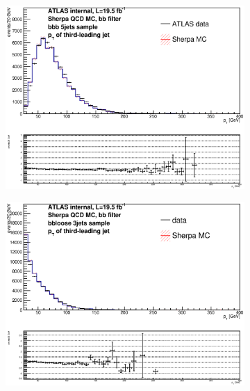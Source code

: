 \begin{figure}[phtb!]
\begin{center}
  \begin{subfigure}[$bbb$ 5+ jet category]{0.3\textwidth}\includegraphics[width=\textwidth]{MonteCarlo/figures/pt2_bbb_5jets.eps}\end{subfigure}
  \begin{subfigure}[$bbloose$ 3 jet category]{0.3\textwidth}\includegraphics[width=\textwidth]{MonteCarlo/figures/pt2_bbloose_3jets.eps}\end{subfigure}

\end{center}
\end{figure}
